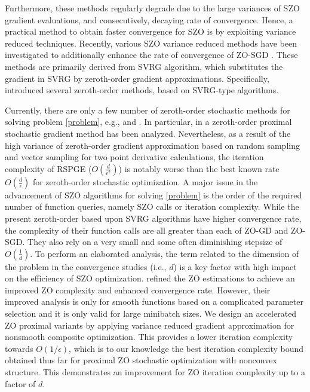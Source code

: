 \documentclass{article}
\theoremstyle{definition}
\theoremstyle{remark}
\begin{document}
 Furthermore, these methods  regularly degrade due to the large variances of SZO gradient evaluations, and consecutively, decaying rate of convergence. Hence, a practical method to obtain faster convergence for SZO is by exploiting variance reduced techniques.
Recently, various SZO variance
reduced methods have been investigated to additionally enhance the rate of convergence of ZO-SGD \cite{liu2018stochastic,liu2018zeroth}. These methods are primarily derived from SVRG algorithm, which substitutes the gradient in
SVRG \cite{johnson2013accelerating} by zeroth-order gradient
approximations. Specifically, \cite{liu2018zeroth} introduced several
zeroth-order methods, based on SVRG-type algorithms. 
 
Currently, there are only a few number of zeroth-order stochastic methods
for solving problem \eqref{problem}, e.g., \cite{ghadimi2016accelerated} and \cite{huang2019faster}. In particular, in \cite{ghadimi2016accelerated} a zeroth-order proximal stochastic gradient method has been analyzed. Nevertheless, as a result of the high variance of zeroth-order gradient approximation based on random sampling and vector sampling for two point derivative calculations, the iteration complexity of RSPGE ($O(\frac{d}{\epsilon^2})$) is notably worse than the best known rate $O(\frac{d}{{\epsilon}})$ for zeroth-order stochastic optimization. A major issue in the advancement of SZO algorithms for solving  \eqref{problem} is the order of the required number of function queries, namely SZO calls or iteration complexity. While the present zeroth-order based upon SVRG algorithms have higher convergence rate, the complexity of their function calls are all greater than each of ZO-GD and ZO-SGD. They also rely on a very small and some often diminishing stepsize of $O(\frac{1}{d})$. To perform an elaborated analysis, the term related to the dimension of the problem in the convergence studies (i.e., $d$) is a key factor with high impact on the efficiency of SZO optimization. \cite{ji2019improved} refined the ZO estimations to achieve an improved ZO complexity and enhanced convergence rate. However, their improved analysis is only for smooth functions based on a complicated parameter selection and it is only valid for large minibatch sizes.
We design an accelerated ZO proximal variants by applying variance reduced gradient approximation for nonsmooth composite optimization. This provides a lower iteration complexity towards $O(1/\epsilon )$, which is to our knowledge the best iteration complexity bound obtained thus far for proximal ZO stochastic optimization with nonconvex structure.
This demonstrates an improvement for ZO iteration complexity up to a factor of ${d}$.
\end{document}
